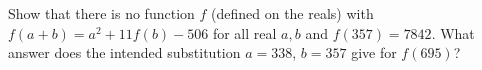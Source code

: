 Show that there is no function $f$ (defined on the reals) with $f(a+b)=a^2+11f(b)-506$ for all real $a,b$ and $f(357)=7842$. What answer does the intended substitution $a=338$, $b=357$ give for $f(695)$?
